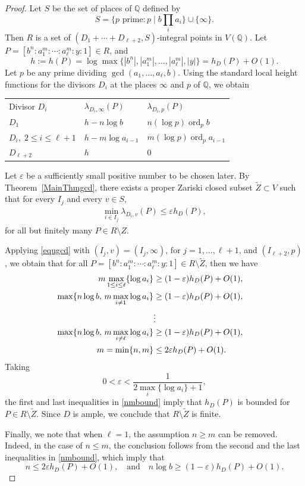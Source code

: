 \documentclass[10pt]{amsart}
\numberwithin{equation}{section}
\theoremstyle{plain}
\theoremstyle{definition}
\begin{document}
\begin{proof}
Let $S$ be the set of places of $\mathbb{Q}$ defined by
\[
S=\{p \text{ prime} : p \mid b\prod_i a_i\}\cup\{\infty\}.
\]
Then $R$ is a set of $(D_1+\cdots+D_{\ell+2},S)$-integral points in $V(\mathbb{Q})$.
Let $P=[b^n:a_1^{m}:\cdots:a_\ell^{m}:y:1]\in R$, and  
\[
h:=h(P)=\log\max\{|b^n|,|a_1^{m}|,\ldots,|a_{\ell}^{m}|,|y|\}=h_D(P)+O(1).
\]
Let $p$ be any prime dividing $\gcd(a_1,\ldots,a_\ell,b)$. Using the standard local height functions for the divisors $D_i$ at the places $\infty$ and $p$ of $\mathbb{Q}$, we obtain
\begin{center}
\begin{tabular}{p{5cm}p{5cm}p{5cm}}
Divisor $D_i$ & $\lambda_{D_i,\infty}(P)$ & $\lambda_{D_i,p}(P)$ \\
$D_1$ & $h-n\log b$ & $n(\log p)\operatorname{ord}_p b$ \\
$D_i,\; 2\le i\le \ell+1$ & $h-m\log a_{i-1}$ & $m(\log p)\operatorname{ord}_p a_{i-1}$ \\
$D_{\ell+2}$ & $h$ & $0$
\end{tabular}
\end{center} 
 




Let $\varepsilon$ be a sufficiently small positive number to be chosen later. By Theorem~\ref{MainThmgcd}, there exists a proper Zariski closed subset $\tilde Z\subset V$ such that for every $I_j$ and every $v\in S$,
\begin{align}
\min_{i\in I_j} \lambda_{D_i,v}(P)\le \varepsilon h_D(P), \label{equgcd}
\end{align}
for all but finitely many $P\in R\setminus Z$.


Applying \eqref{equgcd} with $(I_j,v)=(I_j,\infty)$, for $j=1,\ldots, \ell+1$, and $(I_{\ell+2},p)$, we obtain that for all $P=[b^n:a_1^{m}:\cdots:a_\ell^{m}:y:1]\in R\setminus \tilde Z$, then we have 
\begin{align}\label{nmbound} 
m\max_{1\le i\le\ell} \{\log a_i\} &\ge (1-\varepsilon)h_D(P)+O(1),\cr
 \max\{n\log b,\, m\max_{i\neq 1}\log a_i\} &\ge (1-\varepsilon)h_D(P)+O(1),\cr
 &\vdots\cr
 \max\{n\log b,\, m\max_{i\neq \ell}\log a_i\} &\ge (1-\varepsilon)h_D(P)+O(1),\cr
m=\min\{n,m\}&\le 2\varepsilon h_D(P)+O(1).
\end{align}
Taking
\[
0<\varepsilon<\frac{1}{2\max_i\{\log a_i\}+1},
\]
the first and last inequalities in \eqref{nmbound} imply that $h_D(P)$ is bounded for $P\in R\setminus \tilde  Z$. Since $D$ is ample, we conclude that $R\setminus \tilde Z$ is finite.

Finally, we note that when $\ell=1$, the assumption $n\ge m$ can be removed.   Indeed,  in the case of $n\le m$, the conclusion follows from the second and the last inequalities in \eqref{nmbound}, which imply that 
\[
n\le 2\varepsilon h_D(P)+O(1),\quad \text{and}\quad n\log b \ge (1-\varepsilon)h_D(P)+O(1).
\]
\end{proof}
\end{document}
